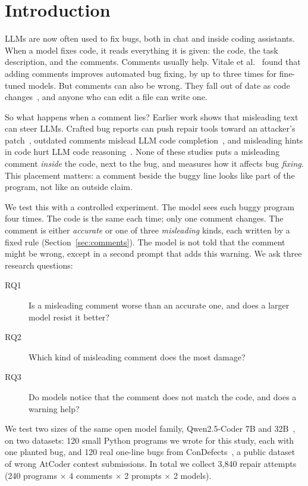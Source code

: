 \documentclass[sigconf,nonacm]{acmart}
\newcommand{\cd}{ConDefects}
\begin{document}
\section{Introduction}

LLMs are now often used to fix bugs, both in chat and inside coding assistants. When a model fixes code, it reads everything it is given: the code, the task description, and the comments. Comments usually help. Vitale et al.~\cite{vitale2026comments} found that adding comments improves automated bug fixing, by up to three times for fine-tuned models. But comments can also be wrong. They fall out of date as code changes~\cite{wen2019inconsistencies}, and anyone who can edit a file can write one.

So what happens when a comment lies? Earlier work shows that misleading text can steer LLMs. Crafted bug reports can push repair tools toward an attacker's patch~\cite{przymus2026adversarial}, outdated comments mislead LLM code completion~\cite{xia2026outdated}, and misleading hints in code hurt LLM code reasoning~\cite{lam2025codecrash}. None of these studies puts a misleading comment \emph{inside} the code, next to the bug, and measures how it affects bug \emph{fixing}. This placement matters: a comment beside the buggy line looks like part of the program, not like an outside claim.

We test this with a controlled experiment. The model sees each buggy program four times. The code is the same each time; only one comment changes. The comment is either \emph{accurate} or one of three \emph{misleading} kinds, each written by a fixed rule (Section~\ref{sec:comments}). The model is not told that the comment might be wrong, except in a second prompt that adds this warning. We ask three research questions:

\begin{description}
\item[RQ1] Is a misleading comment worse than an accurate one, and does a larger model resist it better?
\item[RQ2] Which kind of misleading comment does the most damage?
\item[RQ3] Do models notice that the comment does not match the code, and does a warning help?
\end{description}

We test two sizes of the same open model family, Qwen2.5-Coder 7B and 32B~\cite{hui2024qwen25coder}, on two datasets: 120 small Python programs we wrote for this study, each with one planted bug, and 120 real one-line bugs from \cd{}~\cite{wu2024condefects}, a public dataset of wrong AtCoder contest submissions. In total we collect 3,840 repair attempts (240 programs $\times$ 4 comments $\times$ 2 prompts $\times$ 2 models).
\end{document}
